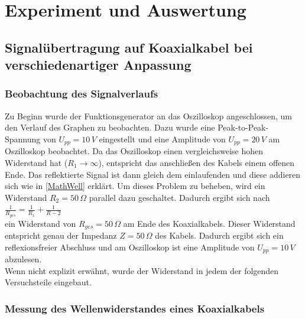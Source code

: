 \documentclass[a4paper,10pt,twocolumn]{scrartcl} %
\begin{document}
\section{Experiment und Auswertung}

	\subsection{Signalübertragung auf Koaxialkabel bei verschiedenartiger Anpassung}

		\subsubsection{Beobachtung des Signalverlaufs}

		Zu Beginn wurde der Funktionsgenerator an das Oszilloskop angeschlossen, um den Verlauf des Graphen zu beobachten.
		Dazu wurde eine Peak-to-Peak-Spannung von $U_{pp} = 10 \, V$ eingestellt und eine Amplitude von $U_{pp} = 20 \, V$ am Oszilloskop beobachtet. 
		Da das Oszilloskop einen vergleichsweise hohen Widerstand hat ($R_{1}\rightarrow\infty$), entspricht das anschließen des Kabels einem offenen Ende.
		Das reflektierte Signal ist dann gleich dem einlaufenden und diese addieren sich wie in \ref{MathWell} erklärt. Um dieses Problem zu beheben, wird ein Widerstand
		$R_2 = 50 \, \Omega$ parallel dazu geschaltet. Dadurch ergibt sich nach \\ 
		$\frac{1}{R_{ges}} = \frac{1}{R_{1}} + \frac{1}{R-2}$ \\
		ein Widerstand von $R_{ges} = 50 \, \Omega$ am Ende des Koaxialkabels. Dieser Widerstand entspricht genau der Impedanz $Z = 50 \, \Omega$ des Kabels.
		Dadurch ergibt sich ein reflexionsfreier Abschluss und am Oszilloskop ist eine Amplitude von $U_{pp} = 10 \, V$ abzulesen.\\
		Wenn nicht explizit erwähnt, wurde der Widerstand in jedem der folgenden Versuchsteile eingebaut.
		
		\subsubsection{Messung des Wellenwiderstandes eines Koaxialkabels}
\end{document}
